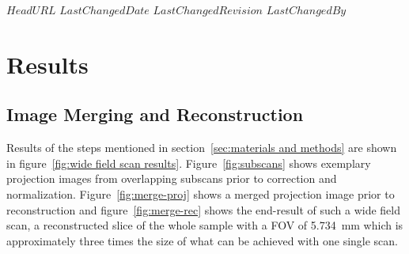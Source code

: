 \svnidlong
{$HeadURL$}
{$LastChangedDate$}
{$LastChangedRevision$}
{$LastChangedBy$}

\begin{center}
\end{center}

\section{Results}
\label{sec:Results}
\subsection{Image Merging and Reconstruction}
\label{sec:Image Merging and Reconstruction}
Results of the steps mentioned in section~\ref{sec:materials and methods} are shown in figure~\ref{fig:wide field scan results}. Figure~\ref{fig:subscans} shows exemplary projection images from overlapping subscans prior to correction and normalization. Figure~\ref{fig:merge-proj} shows a merged projection image prior to reconstruction and figure~\ref{fig:merge-rec} shows the end-result of such a wide field scan, a reconstructed slice of the whole sample with a FOV of \SI{5.734}{\milli\meter} which is approximately three times the size of what can be achieved with one single scan.

